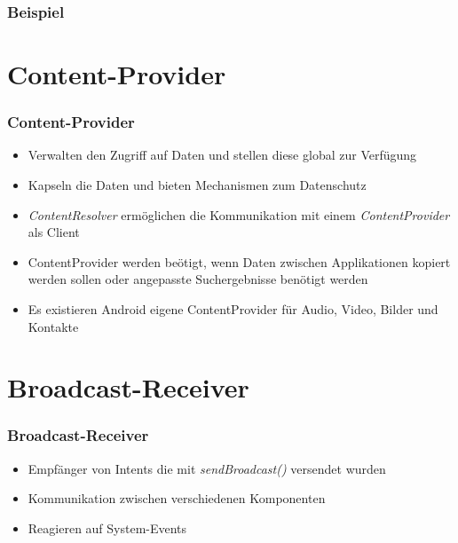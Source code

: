\begin{frame}[label=services]
   \frametitle{Beispiel}
   
\end{frame}

\section{Content-Provider}
\begin{frame}[label=content_provider]
   \frametitle{Content-Provider}
   \begin{itemize}
      \item Verwalten den Zugriff auf Daten und stellen diese global zur Verfügung
      \item Kapseln die Daten und bieten Mechanismen zum Datenschutz
      \item \emph{ContentResolver} ermöglichen die Kommunikation mit 
         einem \emph{ContentProvider} als Client
      \item ContentProvider werden beötigt, wenn Daten zwischen Applikationen 
         kopiert werden sollen oder angepasste Suchergebnisse benötigt werden
      \item Es existieren Android eigene ContentProvider für Audio, Video, 
         Bilder und Kontakte
   \end{itemize}
\end{frame}

\section{Broadcast-Receiver}
\begin{frame}[label=broadcast_receiver]
   \frametitle{Broadcast-Receiver}
   \begin{itemize}
      \item Empfänger von Intents die mit \emph{sendBroadcast()} versendet wurden
      \item Kommunikation zwischen verschiedenen Komponenten
      \item Reagieren auf System-Events
   \end{itemize}

   

   
\end{frame}

